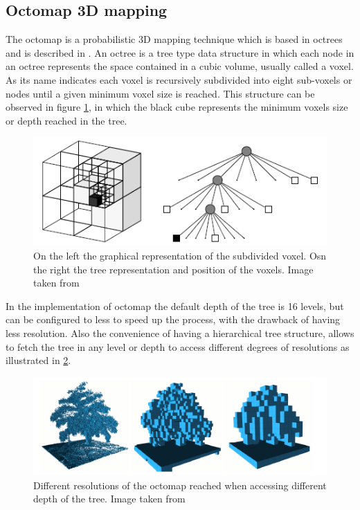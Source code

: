 \documentclass[fontsize=12pt]{article}
\begin{document}
\subsection{Octomap 3D mapping}
The octomap is a  probabilistic 3D mapping technique which is based in octrees and is described in \cite{bib:octomap}. An octree is a tree type data structure in which each node in an octree represents the space contained in a cubic volume, usually called a voxel. As its name indicates each voxel is recursively subdivided into eight sub-voxels or nodes until a given minimum voxel size is reached. This structure can be observed in figure \ref{fig:octree}, in which the black cube represents the minimum voxels size or depth reached in the tree. 
\begin{figure}[H]
\begin{center}
\includegraphics[width=0.8\linewidth]{images/octree}
\caption{On the left the graphical representation of the subdivided voxel. Osn the right the tree representation and position of the voxels. Image taken from \cite{bib:octomap}}
\label{fig:octree}
\end{center}
\end{figure}
In the implementation of octomap the  default depth of the tree is 16 levels, but can be configured to less to speed up the process, with the drawback of having less resolution. Also the convenience of having a hierarchical tree structure, allows to fetch the tree in any level or depth to access different degrees of resolutions as illustrated in  \ref{fig:difrefocto}. 
\begin{figure}[H]
\begin{center}
\includegraphics[width=0.8\linewidth]{images/treedifres}
\caption{Different resolutions of the octomap reached when accessing different depth of the tree. Image taken from \cite{bib:octomap}}
\label{fig:difrefocto}
\end{center}
\end{figure}
\end{document}
